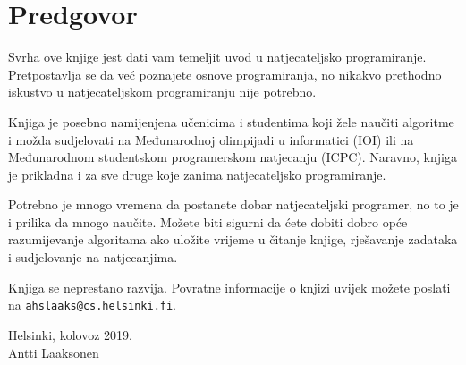 \chapter*{Predgovor}

Svrha ove knjige jest dati vam
temeljit uvod u natjecateljsko programiranje.
Pretpostavlja se da već
poznajete osnove programiranja, no nikakvo prethodno
iskustvo u natjecateljskom programiranju nije potrebno.

Knjiga je posebno namijenjena
učenicima i studentima koji žele naučiti algoritme i
možda sudjelovati na
Međunarodnoj olimpijadi u informatici (IOI) ili
na Međunarodnom studentskom programerskom natjecanju (ICPC).
Naravno, knjiga je prikladna i za 
sve druge koje zanima natjecateljsko programiranje.

Potrebno je mnogo vremena da postanete dobar natjecateljski
programer, no to je i prilika da mnogo naučite.
Možete biti sigurni da ćete dobiti
dobro opće razumijevanje algoritama
ako uložite vrijeme u čitanje knjige,
rješavanje zadataka i sudjelovanje na natjecanjima.

Knjiga se neprestano razvija.
Povratne informacije o knjizi uvijek možete poslati na
\texttt{ahslaaks@cs.helsinki.fi}.

\begin{flushright}
Helsinki, kolovoz 2019. \\
Antti Laaksonen
\end{flushright}
